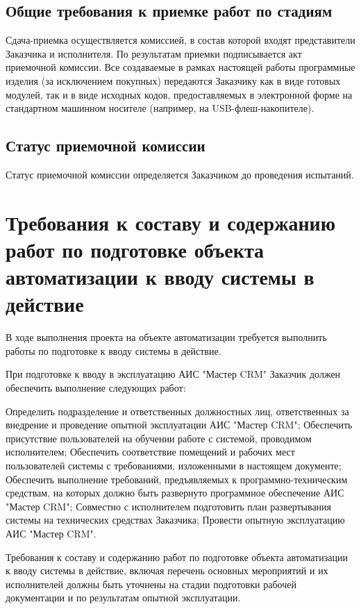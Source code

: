 \documentclass[russian, utf8, 12pt,pointsubsection,floatsubsection]{eskdtext}
\begin{document}
\subsection{Общие требования к приемке работ по стадиям}
Сдача-приемка осуществляется комиссией, в состав которой входят представители Заказчика и исполнителя. По результатам приемки подписывается акт приемочной комиссии. Все создаваемые в рамках настоящей работы программные изделия (за исключением покупных) передаются Заказчику как в виде готовых модулей, так и в виде исходных кодов, предоставляемых в электронной форме на стандартном машинном носителе (например, на USB-флеш-накопителе).
\subsection{Статус приемочной комиссии}
Статус приемочной комиссии определяется Заказчиком до проведения испытаний.

\section{Требования к составу и содержанию работ по подготовке объекта автоматизации к вводу системы в действие}
В ходе выполнения проекта на объекте автоматизации требуется выполнить работы по подготовке к вводу системы в действие.

При подготовке к вводу в эксплуатацию АИС "Мастер CRM" Заказчик должен обеспечить выполнение следующих работ:
\begin{enumerate}
Определить подразделение и ответственных должностных лиц, ответственных за внедрение и проведение опытной эксплуатации АИС "Мастер CRM";
Обеспечить присутствие пользователей на обучении работе с системой, проводимом исполнителем;
Обеспечить соответствие помещений и рабочих мест пользователей системы с требованиями, изложенными в настоящем документе;
Обеспечить выполнение требований, предъявляемых к программно-техническим средствам, на которых должно быть развернуто программное обеспечение АИС "Мастер CRM";
Совместно с исполнителем подготовить план развертывания системы на технических средствах Заказчика;
Провести опытную эксплуатацию АИС "Мастер CRM".
\end{enumerate} 

Требования к составу и содержанию работ по подготовке объекта автоматизации к вводу системы в действие, включая перечень основных мероприятий и их исполнителей должны быть уточнены на стадии подготовки рабочей документации и по результатам опытной эксплуатации.
\end{document}
